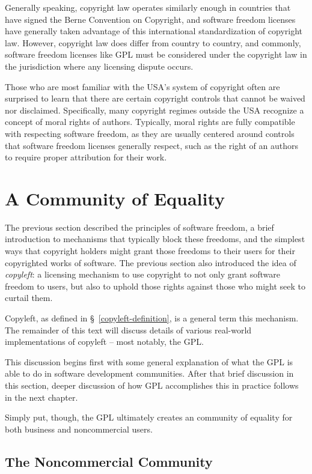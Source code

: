 Generally speaking, copyright law operates similarly enough in countries that
have signed the Berne Convention on Copyright, and software freedom licenses
have generally taken advantage of this international standardization of
copyright law.  However, copyright law does differ from country to country,
and commonly, software freedom licenses like GPL must be considered under the
copyright law in the jurisdiction where any licensing dispute occurs.

Those who are most familiar with the USA's system of copyright often are
surprised to learn that there are certain copyright controls that cannot be
waived nor disclaimed.  Specifically, many copyright regimes outside the USA
recognize a concept of moral rights of authors.  Typically, moral rights are
fully compatible with respecting software freedom, as they are usually
centered around controls that software freedom licenses generally respect,
such as the right of an authors to require proper attribution for their work.

\section{A Community of Equality}

The previous section described the principles of software freedom, a brief
introduction to mechanisms that typically block these freedoms, and the
simplest ways that copyright holders might grant those freedoms to their
users for their copyrighted works of software.  The previous section also
introduced the idea of \textit{copyleft}: a licensing mechanism to use
copyright to not only grant software freedom to users, but also to uphold
those rights against those who might seek to curtail them.

Copyleft, as defined in \S~\ref{copyleft-definition}, is a general term this
mechanism.  The remainder of this text will discuss details of various
real-world implementations of copyleft -- most notably, the GPL\@.

This discussion begins first with some general explanation of what the GPL is
able to do in software development communities.  After that brief discussion
in this section, deeper discussion of how GPL accomplishes this in practice
follows in the next chapter.

Simply put, though, the GPL ultimately creates an community of equality for
both business and noncommercial users.

\subsection{The Noncommercial Community}

